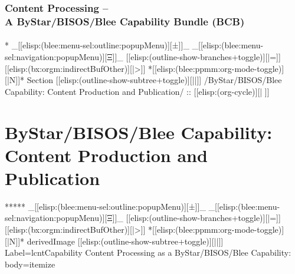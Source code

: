 \begin{whenOrg}
\begin{verblatex}

\begin{frame}[fragile,label=part_bystarCapability]
    \frametitle{Content Processing --\\ A ByStar/BISOS/Blee Capability Bundle (BCB)}
    \framesubtitle{}

    \tableofcontents


\end{frame}
\end{verblatex}




\begin{whenOrg}
*  _[[elisp:(blee:menu-sel:outline:popupMenu)][±]]_ _[[elisp:(blee:menu-sel:navigation:popupMenu)][Ξ]]_ [[elisp:(outline-show-branches+toggle)][|=]] [[elisp:(bx:orgm:indirectBufOther)][|>]] *[[elisp:(blee:ppmm:org-mode-toggle)][|N]]*  Section    [[elisp:(outline-show-subtree+toggle)][||]]   /ByStar/BISOS/Blee Capability: Content Production and Publication/ ::  [[elisp:(org-cycle)][| ]]
\end{whenOrg}

\section{ByStar/BISOS/Blee Capability: Content Production and Publication}

\begin{whenOrg}
*****  _[[elisp:(blee:menu-sel:outline:popupMenu)][±]]_ _[[elisp:(blee:menu-sel:navigation:popupMenu)][Ξ]]_ [[elisp:(outline-show-branches+toggle)][|=]] [[elisp:(bx:orgm:indirectBufOther)][|>]] *[[elisp:(blee:ppmm:org-mode-toggle)][|N]]*  derivedImage [[elisp:(outline-show-subtree+toggle)][||]] Label=lcntCapability Content Processing as a ByStar/BISOS/Blee Capability: body=itemize
\end{whenOrg}


\end{whenOrg}
